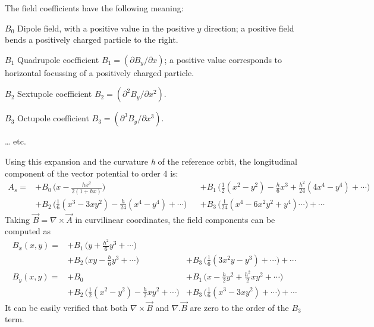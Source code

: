 The field coefficients have the following meaning: 
\begin{madlist}
   \item[$B_0$] 
     Dipole field, with a positive value in the
     positive $y$ direction; a positive field bends a positively
     charged particle to the right.  
   \item[$B_1$] 
     Quadrupole coefficient
     \( B_1 = ( \partial B_y / \partial x ) \);
     a positive value corresponds to horizontal focussing of a
     positively charged particle. 
   \item[$B_2$] 
     Sextupole coefficient
     \( B_2 =  ( \partial^2 B_y / \partial x^2 ) \). 
   \item[$B_3$] 
     Octupole coefficient
     \( B_3 =  ( \partial^3 B_y / \partial x^3 ) \). 
   \item[\ldots] etc.
\end{madlist} 

Using this expansion and the curvature {\it h} of the reference
orbit, the longitudinal component of the vector potential to order 4 is:  
\begin{equation}
\begin{aligned}
A_s =  
&+ B_0\,\Big(x-\frac{hx^2}{2(1+hx)}\Big)&
&+ B_1\,\Big(\frac{1}{2}(x^2-y^2) - \frac{h}{6}x^3 + \frac{h^2}{24}(4x^4-y^4)+\cdots\Big) \\
&+ B_2\,\Big(\frac{1}{6}(x^3-3xy^2) - \frac{h}{24}(x^4-y^4)+\cdots \Big)&
&+ B_3\,\Big(\frac{1}{24}(x^4-6x^2y^2+y^4) \cdots \Big)+\cdots
\end{aligned}
\end{equation}
Taking \(\vec{B} = \nabla \times \vec{A}\) in curvilinear coordinates,
the field components can be computed as  
\begin{equation}\label{eq:field_components}
\begin{aligned}
B_x(x,y) = &+ B_1\,\Big(y+\frac{h^2}{6}y^3+\cdots\Big)  &  \\
           &+ B_2\,\Big(xy - \frac{h}{6}y^3+\cdots \Big) &+ B_3\,\Big(\frac{1}{6}(3x^2y-y^3)+ \cdots \Big)+\cdots\\
B_y(x,y)=  &+ B_0   &+ B_1\,\Big(x-\frac{h}{2}y^2+\frac{h^2}{2}xy^2+\cdots \Big)\\
           &+ B_2\,\Big(\frac{1}{2}(x^2-y^2)-\frac{h}{2}xy^2+\cdots \Big) &+ B_3\,\Big(\frac{1}{6}(x^3-3xy^2)+ \cdots \Big)+\cdots
\end{aligned}
\end{equation}
It can be easily verified that both \(\nabla \times \vec{B}\)
and \(\nabla . \vec{B}\) are zero to the order of the
\(B_3\) term.  


